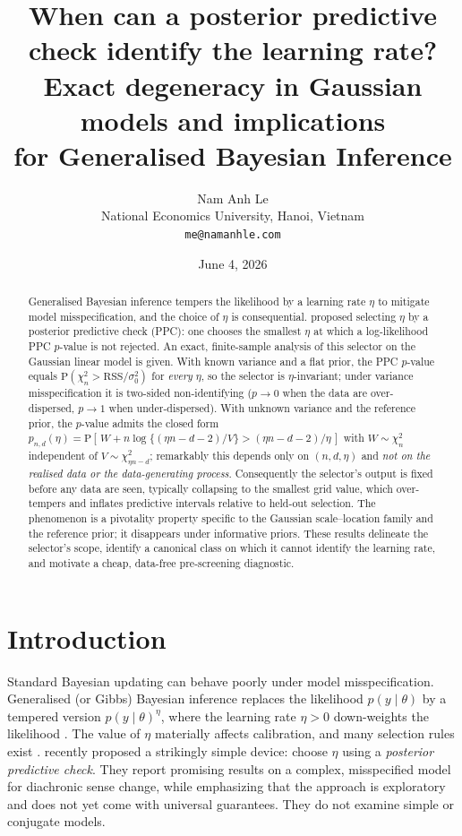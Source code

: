 \documentclass[11pt]{article}
\title{\textbf{When can a posterior predictive check identify the learning rate?\\[0.25em]
Exact degeneracy in Gaussian models and implications\\
for Generalised Bayesian Inference}}
\author{Nam Anh Le\\
\small National Economics University, Hanoi, Vietnam\\
\small \texttt{me@namanhle.com}}
\date{June 4, 2026}
\theoremstyle{remark}
\newcommand{\RSS}{\mathrm{RSS}}
\newcommand{\Prob}{\mathrm{P}}
\newcommand{\chisq}{\chi^2}
\begin{document}
\maketitle

\begin{abstract}
Generalised Bayesian inference tempers the likelihood by a learning rate $\eta$ to mitigate model
misspecification, and the choice of $\eta$ is consequential. \citet{zafar2024} proposed selecting $\eta$ by a
posterior predictive check (PPC): one chooses the smallest $\eta$ at which a log-likelihood PPC $p$-value is not
rejected. An exact, finite-sample analysis of this selector on the Gaussian linear model is given. With known
variance and a flat prior, the PPC $p$-value equals $\Prob(\chisq_n > \RSS/\sigma_0^2)$ for \emph{every} $\eta$,
so the selector is $\eta$-invariant; under variance misspecification it is two-sided non-identifying
($p\to 0$ when the data are over-dispersed, $p\to 1$ when under-dispersed). With unknown variance and the
reference prior, the $p$-value admits the closed form
$p_{n,d}(\eta)=\Prob[\,W+n\log\{(\eta n-d-2)/V\}>(\eta n-d-2)/\eta\,]$ with $W\sim\chisq_n$ independent of
$V\sim\chisq_{\eta n-d}$; remarkably this depends only on $(n,d,\eta)$ and \emph{not on the realised data or the
data-generating process}. Consequently the selector's output is fixed before any data are seen, typically
collapsing to the smallest grid value, which over-tempers and inflates predictive intervals relative to held-out
selection. The phenomenon is a pivotality property specific to the Gaussian scale--location family and the
reference prior; it disappears under informative priors. These results delineate the
selector's scope, identify a canonical class on which it cannot identify the learning rate, and motivate a cheap, data-free
pre-screening diagnostic.
\end{abstract}

\section{Introduction}
Standard Bayesian updating can behave poorly under model misspecification. Generalised (or Gibbs) Bayesian
inference replaces the likelihood $p(y\mid\theta)$ by a tempered version $p(y\mid\theta)^{\eta}$, where the
learning rate $\eta>0$ down-weights the likelihood \citep{bissiri2016,grunwald2017}. The value of $\eta$
materially affects calibration, and many selection rules exist \citep{holmes2017,lyddon2019,syring2019,wu2023,
lee2025}. \citet{zafar2024} recently proposed a strikingly simple device: choose $\eta$ using a
\emph{posterior predictive check}. They report promising results on a complex, misspecified model for diachronic
sense change, while emphasizing that the approach is exploratory and does not yet come with universal
guarantees. They do not examine simple or conjugate models.
\end{document}
